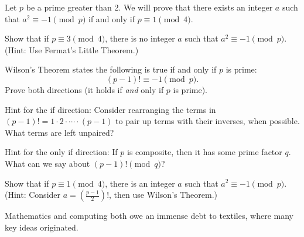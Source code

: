 \documentclass[11pt]{article}
\begin{document}

Let $p$ be a prime greater than 2. We will prove that there exists an integer $a$ such that $a^2 \equiv -1 \pmod{p}$ if and only if $p \equiv 1 \pmod{4}$.

\begin{Parts}
	\Part Show that if $p \equiv 3 \pmod{4}$, there is no integer $a$ such that $a^2 \equiv -1 \pmod{p}$. (Hint: Use Fermat's Little Theorem.)

    \Part Wilson's Theorem states the following is true if and only if $p$ is prime:
    \[(p - 1)! \equiv -1 \pmod{p}.\]
    Prove both directions (it holds if \emph{and} only if $p$ is prime).

    Hint for the if direction: Consider rearranging the terms in $(p - 1)! = 1 \cdot 2 \cdot \cdots \cdot (p - 1)$ to pair up terms with their inverses, when possible. What terms are left unpaired?

    Hint for the only if direction: If $p$ is composite, then it has some prime factor $q$.  What can we say about $(p-1)! \pmod{q}$?

    \Part Show that if $p \equiv 1 \pmod{4}$, there is an integer $a$ such that $a^2 \equiv -1 \pmod{p}$. (Hint: Consider $a = \left(\frac{p - 1}{2}\right)!$, then use Wilson's Theorem.)
\end{Parts}

Mathematics and computing both owe an immense debt to textiles, where many key ideas originated.
\end{document}
